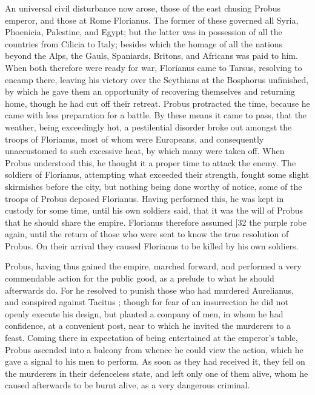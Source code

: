 An universal civil disturbance now arose, those of the east chusing Probus emperor, and those at Rome Florianus. The former of these governed all Syria, Phoenicia, Palestine, and Egypt; but the latter was in possession of all the countries from Cilicia to Italy; besides which the homage of all the nations beyond the Alps, the Gauls, Spaniards, Britons, and Africans was paid to him. When both therefore were ready for war, Florianus came to Tarsus, resolving to encamp there, leaving his victory over the Scythians at the Bosphorus unfinished, by which he gave them an opportunity of recovering themselves and returning home, though he had cut off their retreat. Probus protracted the time, because he came with less preparation for a battle. By these means it came to pass, that the weather, being exceedingly hot, a pestilential disorder broke out amongst the troops of Florianus, most of whom were Europeans, and consequently unaccustomed to such excessive heat, by which many were taken off. When Probus understood this, he thought it a proper time to attack the enemy. The soldiers of Florianus, attempting what exceeded their strength, fought some slight skirmishes before the city, but nothing being done worthy of notice, some of the troops of Probus deposed Florianus. Having performed this, he was kept in custody for some time, until his own soldiers said, that it was the will of Probus that he should share the empire. Florianus therefore assumed
|32 the purple robe again, until the return of those who were sent to know the true resolution of Probus. On their arrival they caused Florianus to be killed by his own soldiers.

Probus, having thus gained the empire, marched forward, and performed a very commendable action for the public good, as a prelude to what he should afterwards do. For he resolved to punish those who had murdered Aurelianus, and conspired against Tacitus ; though for fear of an insurrection he did not openly execute his design, but planted a company of men, in whom he had confidence, at a convenient post, near to which he invited the murderers to a feast. Coming there in expectation of being entertained at the emperor's table, Probus ascended into a balcony from whence he could view the action, which he gave a signal to his men to perform. As soon as they had received it, they fell on the murderers in their defenceless state, and left only one of them alive, whom he caused afterwards to be burnt alive, as a very dangerous criminal.

